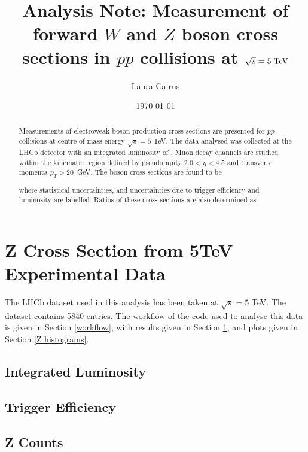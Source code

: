 \documentclass[a4paper]{article}
\title{Analysis Note: Measurement of forward $W$ and $Z$ boson cross sections in $pp$ collisions at $\sqrt{s}=5 \; \rm{TeV}$}
\author{Laura Cairns}
\date{\today}
\begin{document}
\maketitle

\begin{abstract}
    \noindent 
    Measurements of electroweak boson production cross sections are presented for $pp$ collisions at centre of mass energy $\sqrt{s} = 5$ TeV. The data analysed was collected at the LHCb detector with an integrated luminosity of . Muon decay channels are studied within the kinematic region defined by pseudorapity $2.0 < \eta < 4.5$ and transverse momenta $p_T > 20$~GeV. The boson cross sections are found to be
    
    
    
    where statistical uncertainties, and uncertainties due to trigger efficiency and luminosity are labelled. Ratios of these cross sections are also determined as 
    
    
\end{abstract}


\section{Z Cross Section from 5TeV Experimental Data} \label{results}

The LHCb dataset used in this analysis has been taken at $\sqrt{s} = 5$ TeV. The dataset contains 5840 entries. The workflow of the code used to analyse this data is given in Section \ref{workflow}, with results given in Section \ref{results}, and plots given in Section \ref{Z histograms}.

\subsection{Integrated Luminosity} \label{lumi_val}


\subsection{Trigger Efficiency} \label{trigger_val}


\subsection{Z Counts} \label{counts_val}

\end{document}
